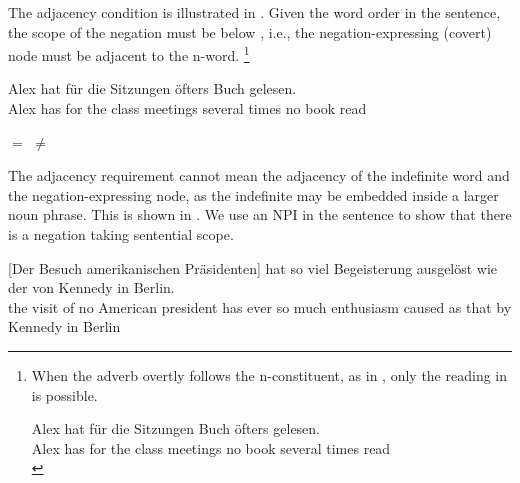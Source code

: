 \documentclass[output=paper]{langsci/langscibook}
\begin{document}
The adjacency condition is illustrated in . Given the word order in the sentence, the scope of the negation must be below , i.e., the negation-expressing (covert) node 
must be adjacent to the n-word.%
\footnote{When the adverb overtly follows the n-constituent, as in
  , only the reading in  is
  possible.
  
\ea \label{not-often}
\gll Alex hat für die Sitzungen  Buch öfters gelesen.\\
Alex has for the {class meetings} no book {several times} read\\
\z


}

\ea \label{often-homework} 
\gll Alex hat für die Sitzungen öfters  Buch gelesen.\\
Alex has for the {class meetings} {several times} no {book} read\\
\begin{xlist} 
\ex 
$=$ \label{oefters-nicht}
\ex 
$\not=$ \label{nicht-oefters}
\end{xlist}
\z 





The adjacency requirement cannot mean the adjacency of the indefinite word and the negation-expressing node, as the indefinite may be embedded inside a larger noun phrase. 
This is shown in . 
We use an NPI in the sentence to show that there is a negation taking sentential scope.

\ea \label{kennedy}
\gll {}[Der Besuch  amerikanischen Präsidenten] hat  so viel Begeisterung ausgelöst wie der von Kennedy in Berlin.\\
\hphantom{[}the visit {of no} American president has ever so much enthusiasm caused as {that} by Kennedy in Berlin\\
\glt {}
\z 
\end{document}
